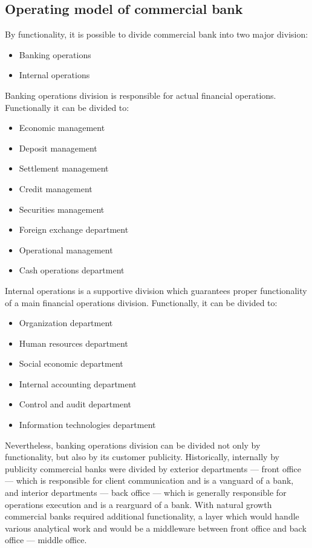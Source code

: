 \subsection{Operating model of commercial bank}

By functionality, it is possible to divide commercial bank into two major division:
\begin{itemize}
    \item Banking operations
    \item Internal operations
\end{itemize}

Banking operations division is responsible for actual financial operations. Functionally it can be divided to:
\begin{itemize}
    \item Economic management
    \item Deposit management
    \item Settlement management
    \item Credit management
    \item Securities management
    \item Foreign exchange department
    \item Operational management
    \item Cash operations department
\end{itemize}

Internal operations is a supportive division which guarantees proper functionality of a main financial operations division.
Functionally, it can be divided to:
\begin{itemize}
    \item Organization department
    \item Human resources department
    \item Social economic department
    \item Internal accounting department
    \item Control and audit department
    \item Information technologies department
\end{itemize}

Nevertheless, banking operations division can be divided not only by functionality, but also by its customer publicity.
Historically, internally by publicity commercial banks were divided by exterior departments — front office — which is responsible for client communication and is a vanguard of a bank, and interior departments — back office — which is generally responsible for operations execution and is a rearguard of a bank.
With natural growth commercial banks required additional functionality, a layer which would handle various analytical work and would be a middleware between front office and back office — middle office.

